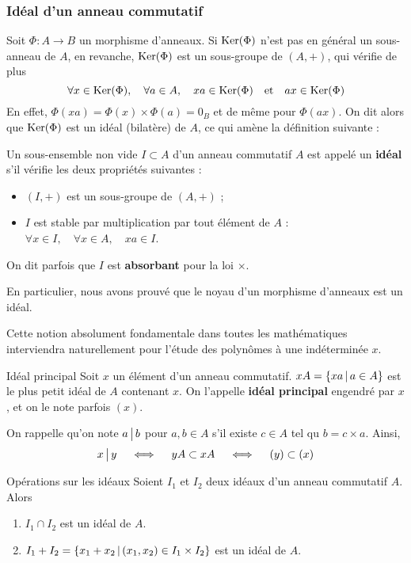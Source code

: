     \subsubsection{Idéal d’un anneau commutatif}

    Soit $\Phi : A \to B$ un morphisme d’anneaux. Si $\operatorname{Ker}(\Phi)$ n’est pas en général un sous-anneau de $A$, en revanche, $\operatorname{Ker}(\Phi)$ est un sous-groupe de $(A,+)$, qui vérifie de plus 
    \[ \forall x \in \operatorname{Ker}(\Phi), \quad \forall a \in A, \quad xa \in \operatorname{Ker}(\Phi) \quad \text{et} \quad ax \in \operatorname{Ker}(\Phi) \]   
    En effet, $\Phi(xa) = \Phi(x) \times \Phi(a) = 0_B$ et de même pour $\Phi(ax)$. On dit alors que $\operatorname{Ker}(\Phi)$ est un idéal (bilatère) de $A$, ce qui amène la définition suivante :

    \begin{defi}{}{}
        Un sous-ensemble non vide $I \subset A$ d’un anneau commutatif $A$ est appelé un \textbf{idéal} s’il vérifie les deux propriétés suivantes :
        \begin{itemize}
            \item $(I,+)$ est un sous-groupe de $(A,+)$ ;
            \item $I$ est stable par multiplication par tout élément de $A$ : $\forall x \in I, \quad \forall x \in A, \quad xa \in I$.
        \end{itemize}
        On dit parfois que $I$ est \textbf{absorbant} pour la loi $\times$.
    \end{defi}

    En particulier, nous avons prouvé que le noyau d’un morphisme d’anneaux est un idéal.

    Cette notion absolument fondamentale dans toutes les mathématiques interviendra naturellement pour l’étude des polynômes à une indéterminée $x$.

    \begin{defitheo}{Idéal principal}{}
        Soit $x$ un élément d’un anneau commutatif. $xA = \left\{xa \, \middle| \, a \in A\right\}$ est le plus petit idéal de $A$ contenant $x$. On l’appelle \textbf{idéal principal} engendré par $x$, et on le note parfois $(x)$.
    \end{defitheo}

    On rappelle qu’on note $a \, \big| \, b$ pour $a,b \in A$ s’il existe $c \in A$ tel qu $b = c \times a$. Ainsi, 
    \[ x \, \big| \, y \quad \iff \quad yA \subset x A \quad \iff \quad (y) \subset (x) \]   

    \begin{prop}{Opérations sur les idéaux}{}
        Soient $I_1$ et $I_2$ deux idéaux d’un anneau commutatif $A$. Alors 
        \begin{enumerate}
            \item $I_1 \cap I_2$ est un idéal de $A$.
            \item $I_1 + I_2 = \left\{x_1 + x_2 \, \middle| \, (x_1,x_2) \in I_1 \times I_2\right\}$ est un idéal de $A$.
        \end{enumerate}
    \end{prop}

